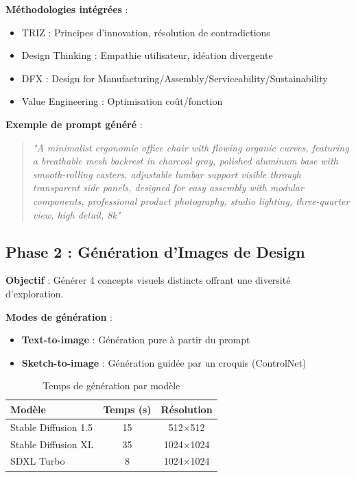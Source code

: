 \documentclass[12pt,a4paper]{article}
\begin{document}
\textbf{Méthodologies intégrées} :
\begin{itemize}
    \item TRIZ : Principes d'innovation, résolution de contradictions
    \item Design Thinking : Empathie utilisateur, idéation divergente
    \item DFX : Design for Manufacturing/Assembly/Serviceability/Sustainability
    \item Value Engineering : Optimisation coût/fonction
\end{itemize}

\textbf{Exemple de prompt généré} :
\begin{quote}
\textit{"A minimalist ergonomic office chair with flowing organic curves, featuring a breathable mesh backrest in charcoal gray, polished aluminum base with smooth-rolling casters, adjustable lumbar support visible through transparent side panels, designed for easy assembly with modular components, professional product photography, studio lighting, three-quarter view, high detail, 8k"}
\end{quote}

\subsection{Phase 2 : Génération d'Images de Design}

\textbf{Objectif} : Générer 4 concepts visuels distincts offrant une diversité d'exploration.

\textbf{Modes de génération} :
\begin{itemize}
    \item \textbf{Text-to-image} : Génération pure à partir du prompt
    \item \textbf{Sketch-to-image} : Génération guidée par un croquis (ControlNet)
\end{itemize}

\begin{table}[H]
\centering
\caption{Temps de génération par modèle}
\begin{tabular}{@{}lcc@{}}
\toprule
\textbf{Modèle} & \textbf{Temps (s)} & \textbf{Résolution} \\ 
\midrule
Stable Diffusion 1.5 & 15 & 512×512 \\
Stable Diffusion XL & 35 & 1024×1024 \\
SDXL Turbo & 8 & 1024×1024 \\
\bottomrule
\end{tabular}
\end{table}
\end{document}

